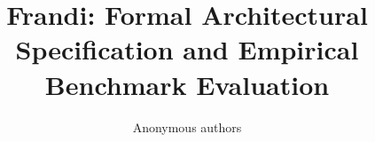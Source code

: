 \title{\textbf{Frandi: Formal Architectural Specification and Empirical Benchmark Evaluation}}

\author{Anonymous authors}
